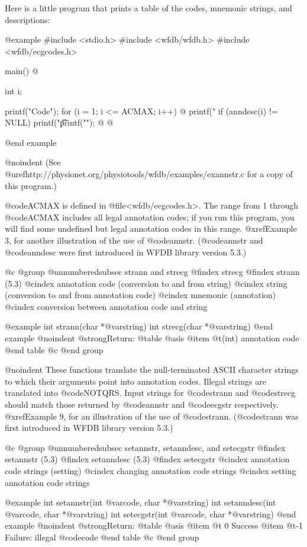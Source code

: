 {{{{{{{{Here is a little program that prints a table of the codes, mnemonic
strings, and descriptions:

@example
#include <stdio.h>
#include <wfdb/wfdb.h>
#include <wfdb/ecgcodes.h>

main()
@{
    int i;

    printf("Code\tMnemonic\tDescription\n");
    for (i = 1; i <= ACMAX; i++) @{
        printf("%
        if (anndesc(i) != NULL)
            printf("\t\t%
        printf("\n");
    @}
@}
@end example

@noindent
(See @uref{http://physionet.org/physiotools/wfdb/examples/exannstr.c}
for a copy of this program.)

@code{ACMAX} is defined in @file{<wfdb/ecgcodes.h>}.  The range from 1
through @code{ACMAX} includes all legal annotation codes; if you run
this program, you will find some undefined but legal annotation codes in
this range. @xref{Example 3}, for another illustration of the use of
@code{annstr}.  (@code{annstr} and @code{anndesc} were first introduced
in WFDB library version 5.3.)

@c @group
@unnumberedsubsec strann and strecg
@findex strecg
@findex strann (5.3)
@cindex annotation code (conversion to and from string)
@cindex string (conversion to and from annotation code)
@cindex mnemonic (annotation)
@cindex conversion between annotation code and string

@example
int strann(char *@var{string})
int strecg(char *@var{string})
@end example
@noindent
@strong{Return:}
@table @asis
@item @t{(int)}
annotation code
@end table
@c @end group

@noindent
These functions translate the null-terminated ASCII character strings to
which their arguments point into annotation codes.  Illegal strings are
translated into @code{NOTQRS}.  Input strings for @code{strann} and
@code{strecg} should match those returned by @code{annstr} and
@code{ecgstr} respectively.  @xref{Example 9}, for an illustration of the
use of @code{strann}. (@code{strann} was first introduced in WFDB library
version 5.3.)

@c @group
@unnumberedsubsec setannstr, setanndesc, and setecgstr
@findex setannstr (5.3)
@findex setanndesc (5.3)
@findex setecgstr
@cindex annotation code strings (setting)
@cindex changing annotation code strings
@cindex setting annotation code strings

@example
int setannstr(int @var{code}, char *@var{string})
int setanndesc(int @var{code}, char *@var{string})
int setecgstr(int @var{code}, char *@var{string})
@end example
@noindent
@strong{Return:}
@table @asis
@item @t{ 0}
Success
@item @t{-1}
Failure: illegal @code{code}
@end table
@c @end group

}}}}}}}}
